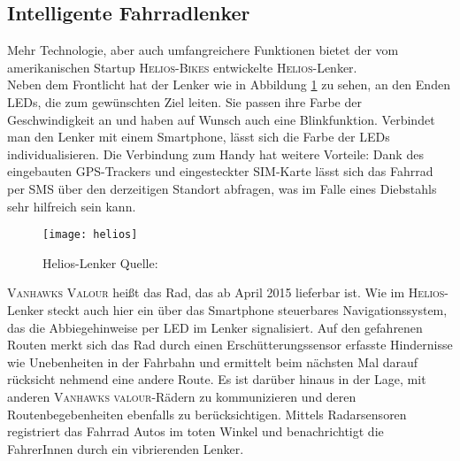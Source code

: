 \subsection{Intelligente Fahrradlenker}
Mehr Technologie, aber auch umfangreichere Funktionen bietet der vom amerikanischen Startup \textsc{Helios-Bikes} entwickelte \textsc{Helios}-Lenker.\\ 
Neben dem Frontlicht hat der Lenker wie in Abbildung \ref{fig:helios} zu sehen, an den Enden \glspl{LED}, die zum gewünschten Ziel leiten. Sie passen ihre Farbe der Geschwindigkeit an und haben auf Wunsch auch eine Blinkfunktion. Verbindet man den Lenker mit einem \gls{Smartphone}, lässt sich die Farbe der \glspl{LED} individualisieren. Die Verbindung zum Handy hat weitere Vorteile: Dank des eingebauten \gls{GPS}-Trackers und eingesteckter SIM-Karte lässt sich das Fahrrad per SMS über den derzeitigen Standort abfragen\cite{Helios}, was im Falle eines Diebstahls sehr hilfreich sein kann.\\ 
\begin{figure}[H]
    \centering
    \texttt{[image: helios]}
    \grayRule
    \caption[Helios-Lenker]{Helios-Lenker  Quelle: \cite{Helios}}		
    \label{fig:helios}
\end{figure}
\textsc{Vanhawks Valour} heißt das Rad, das ab April 2015 lieferbar ist. Wie im \textsc{Helios}-Lenker steckt auch hier ein über das \gls{Smartphone} steuerbares Navigationssystem, das die Abbiegehinweise per \gls{LED} im Lenker signalisiert. Auf den gefahrenen Routen merkt sich das Rad durch einen Erschütterungssensor erfasste Hindernisse wie Unebenheiten in der Fahrbahn und ermittelt beim nächsten Mal darauf rücksicht nehmend eine andere Route. Es ist darüber hinaus in der Lage, mit anderen \textsc{Vanhawks valour}-Rädern zu kommunizieren und deren Routenbegebenheiten ebenfalls zu berücksichtigen. Mittels Radarsensoren registriert das Fahrrad Autos im toten Winkel und benachrichtigt die FahrerInnen durch ein vibrierenden Lenker. \cite{vanhawks}
